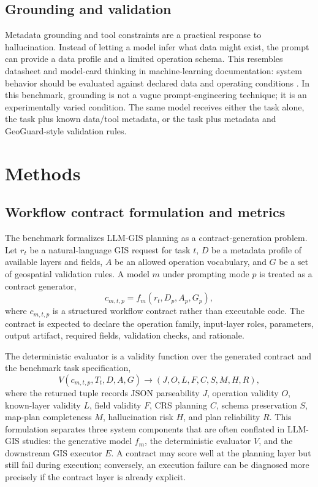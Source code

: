 \documentclass[12pt]{gsis}  %
\begin{document}
\subsection{Grounding and validation}

Metadata grounding and tool constraints are a practical response to hallucination. Instead of letting a model infer what data might exist, the prompt can provide a data profile and a limited operation schema. This resembles datasheet and model-card thinking in machine-learning documentation: system behavior should be evaluated against declared data and operating conditions \citep{Gebru2021Datasheets,Mitchell2019ModelCards}. In this benchmark, grounding is not a vague prompt-engineering technique; it is an experimentally varied condition. The same model receives either the task alone, the task plus known data/tool metadata, or the task plus metadata and GeoGuard-style validation rules.

\section{Methods}

\subsection{Workflow contract formulation and metrics}

The benchmark formalizes LLM-GIS planning as a contract-generation problem. Let \(r_t\) be a natural-language GIS request for task \(t\), \(D\) be a metadata profile of available layers and fields, \(A\) be an allowed operation vocabulary, and \(G\) be a set of geospatial validation rules. A model \(m\) under prompting mode \(p\) is treated as a contract generator,
\begin{equation}
c_{m,t,p}=f_m(r_t,D_p,A_p,G_p),
\label{eq:contract-generator}
\end{equation}
where \(c_{m,t,p}\) is a structured workflow contract rather than executable code. The contract is expected to declare the operation family, input-layer roles, parameters, output artifact, required fields, validation checks, and rationale.

The deterministic evaluator is a validity function over the generated contract and the benchmark task specification,
\begin{equation}
V(c_{m,t,p},T_t,D,A,G) \rightarrow (J,O,L,F,C,S,M,H,R),
\label{eq:validity-function}
\end{equation}
where the returned tuple records JSON parseability \(J\), operation validity \(O\), known-layer validity \(L\), field validity \(F\), CRS planning \(C\), schema preservation \(S\), map-plan completeness \(M\), hallucination risk \(H\), and plan reliability \(R\). This formulation separates three system components that are often conflated in LLM-GIS studies: the generative model \(f_m\), the deterministic evaluator \(V\), and the downstream GIS executor \(E\). A contract may score well at the planning layer but still fail during execution; conversely, an execution failure can be diagnosed more precisely if the contract layer is already explicit.
\end{document}
